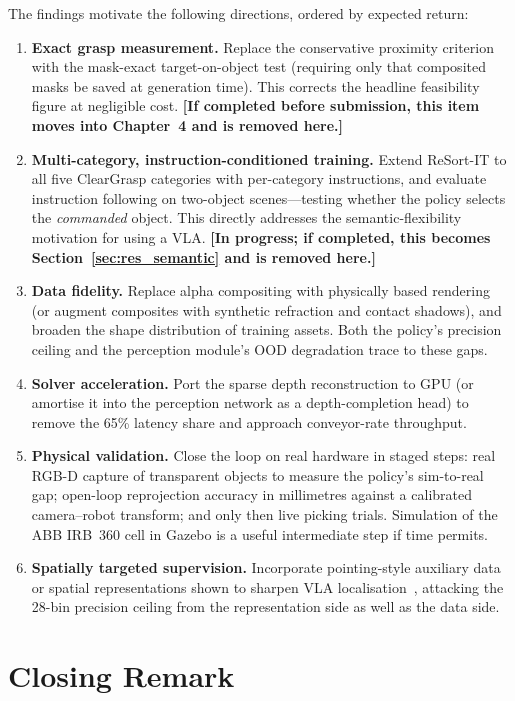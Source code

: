 The findings motivate the following directions, ordered by expected return:

\begin{enumerate}
    \item \textbf{Exact grasp measurement.} Replace the conservative proximity criterion with the mask-exact target-on-object test (requiring only that composited masks be saved at generation time). This corrects the headline feasibility figure at negligible cost. \textbf{[If completed before submission, this item moves into Chapter~4 and is removed here.]}
    \item \textbf{Multi-category, instruction-conditioned training.} Extend ReSort-IT to all five ClearGrasp categories with per-category instructions, and evaluate instruction following on two-object scenes---testing whether the policy selects the \emph{commanded} object. This directly addresses the semantic-flexibility motivation for using a VLA. \textbf{[In progress; if completed, this becomes Section~\ref{sec:res_semantic} and is removed here.]}
    \item \textbf{Data fidelity.} Replace alpha compositing with physically based rendering (or augment composites with synthetic refraction and contact shadows), and broaden the shape distribution of training assets. Both the policy's precision ceiling and the perception module's OOD degradation trace to these gaps.
    \item \textbf{Solver acceleration.} Port the sparse depth reconstruction to GPU (or amortise it into the perception network as a depth-completion head) to remove the 65\% latency share and approach conveyor-rate throughput.
    \item \textbf{Physical validation.} Close the loop on real hardware in staged steps: real RGB-D capture of transparent objects to measure the policy's sim-to-real gap; open-loop reprojection accuracy in millimetres against a calibrated camera--robot transform; and only then live picking trials. Simulation of the ABB IRB~360 cell in Gazebo is a useful intermediate step if time permits.
    \item \textbf{Spatially targeted supervision.} Incorporate pointing-style auxiliary data or spatial representations shown to sharpen VLA localisation~\citep{yuan2024, qu2025}, attacking the 28-bin precision ceiling from the representation side as well as the data side.
\end{enumerate}

\section{Closing Remark}
\label{sec:closing}

